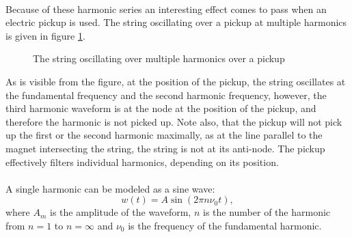\documentclass{article}
\begin{document}
\paragraph*{} 
Because of these harmonic series an interesting effect comes to pass when an 
electric pickup is used. The string oscillating over a pickup at multiple 
harmonics is given in figure \ref{fig:pickup-harmonics}. 
\begin{figure}[ht]
	\centering
	\caption{The string oscillating over multiple harmonics over a pickup}
	\label{fig:pickup-harmonics}
\end{figure}
As is visible from the figure, at the position of the pickup, the string 
oscillates at the fundamental frequency and the second harmonic frequency, 
however, the third harmonic waveform is at the node at the position of the 
pickup, and therefore the harmonic is not picked up. Note also, that the 
pickup will not pick up the first or the second harmonic maximally, as at the 
line parallel to the magnet intersecting the string, the string is not at its 
anti-node. The pickup effectively filters individual harmonics, depending on
its position.

\paragraph*{} 
A single harmonic can be modeled as a sine wave:
\begin{equation} 
	w(t) = A \sin ( 2 \pi n \nu_0 t),
	\label{eqn:basic-harmonic}
\end{equation}
where $A_m$ is the amplitude of the waveform, $n$ is the number of the 
harmonic from $n=1$ to $n=\infty$ and $\nu_0$ is the frequency of the 
fundamental harmonic.
\end{document}
